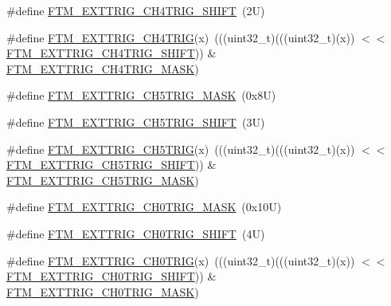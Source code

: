 \begin{DoxyCompactItemize}
\item 
\#define \mbox{\hyperlink{group___f_t_m___register___masks_ga314862acbbedef36aca6aaccd9b1ff74}{F\+T\+M\+\_\+\+E\+X\+T\+T\+R\+I\+G\+\_\+\+C\+H4\+T\+R\+I\+G\+\_\+\+S\+H\+I\+FT}}~(2\+U)
\item 
\#define \mbox{\hyperlink{group___f_t_m___register___masks_ga268b90292a159a4846512873ee2a6b38}{F\+T\+M\+\_\+\+E\+X\+T\+T\+R\+I\+G\+\_\+\+C\+H4\+T\+R\+IG}}(x)~(((uint32\+\_\+t)(((uint32\+\_\+t)(x)) $<$$<$ \mbox{\hyperlink{group___f_t_m___register___masks_ga314862acbbedef36aca6aaccd9b1ff74}{F\+T\+M\+\_\+\+E\+X\+T\+T\+R\+I\+G\+\_\+\+C\+H4\+T\+R\+I\+G\+\_\+\+S\+H\+I\+FT}})) \& \mbox{\hyperlink{group___f_t_m___register___masks_gaf8bedf8c8979cb1fa16cb9b35c7a4399}{F\+T\+M\+\_\+\+E\+X\+T\+T\+R\+I\+G\+\_\+\+C\+H4\+T\+R\+I\+G\+\_\+\+M\+A\+SK}})
\item 
\#define \mbox{\hyperlink{group___f_t_m___register___masks_ga26b412d681cbb61d30d2e9d25c906b66}{F\+T\+M\+\_\+\+E\+X\+T\+T\+R\+I\+G\+\_\+\+C\+H5\+T\+R\+I\+G\+\_\+\+M\+A\+SK}}~(0x8\+U)
\item 
\#define \mbox{\hyperlink{group___f_t_m___register___masks_gadb3658c9b3090cf71c98a986137a0295}{F\+T\+M\+\_\+\+E\+X\+T\+T\+R\+I\+G\+\_\+\+C\+H5\+T\+R\+I\+G\+\_\+\+S\+H\+I\+FT}}~(3\+U)
\item 
\#define \mbox{\hyperlink{group___f_t_m___register___masks_gace9076e72b2a9124f74b304df3a7e124}{F\+T\+M\+\_\+\+E\+X\+T\+T\+R\+I\+G\+\_\+\+C\+H5\+T\+R\+IG}}(x)~(((uint32\+\_\+t)(((uint32\+\_\+t)(x)) $<$$<$ \mbox{\hyperlink{group___f_t_m___register___masks_gadb3658c9b3090cf71c98a986137a0295}{F\+T\+M\+\_\+\+E\+X\+T\+T\+R\+I\+G\+\_\+\+C\+H5\+T\+R\+I\+G\+\_\+\+S\+H\+I\+FT}})) \& \mbox{\hyperlink{group___f_t_m___register___masks_ga26b412d681cbb61d30d2e9d25c906b66}{F\+T\+M\+\_\+\+E\+X\+T\+T\+R\+I\+G\+\_\+\+C\+H5\+T\+R\+I\+G\+\_\+\+M\+A\+SK}})
\item 
\#define \mbox{\hyperlink{group___f_t_m___register___masks_ga8c677fe12d48d6f0c1b336df2aaff174}{F\+T\+M\+\_\+\+E\+X\+T\+T\+R\+I\+G\+\_\+\+C\+H0\+T\+R\+I\+G\+\_\+\+M\+A\+SK}}~(0x10\+U)
\item 
\#define \mbox{\hyperlink{group___f_t_m___register___masks_ga2c365c7c86ae305f243cd065d9bb9202}{F\+T\+M\+\_\+\+E\+X\+T\+T\+R\+I\+G\+\_\+\+C\+H0\+T\+R\+I\+G\+\_\+\+S\+H\+I\+FT}}~(4\+U)
\item 
\#define \mbox{\hyperlink{group___f_t_m___register___masks_ga5033d41dbadd83cd16af4cc20467a6e6}{F\+T\+M\+\_\+\+E\+X\+T\+T\+R\+I\+G\+\_\+\+C\+H0\+T\+R\+IG}}(x)~(((uint32\+\_\+t)(((uint32\+\_\+t)(x)) $<$$<$ \mbox{\hyperlink{group___f_t_m___register___masks_ga2c365c7c86ae305f243cd065d9bb9202}{F\+T\+M\+\_\+\+E\+X\+T\+T\+R\+I\+G\+\_\+\+C\+H0\+T\+R\+I\+G\+\_\+\+S\+H\+I\+FT}})) \& \mbox{\hyperlink{group___f_t_m___register___masks_ga8c677fe12d48d6f0c1b336df2aaff174}{F\+T\+M\+\_\+\+E\+X\+T\+T\+R\+I\+G\+\_\+\+C\+H0\+T\+R\+I\+G\+\_\+\+M\+A\+SK}})
$$
\end{DoxyCompactItemize}
